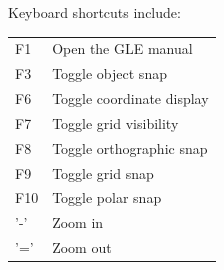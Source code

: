 \vspace{0.5cm}
Keyboard shortcuts include:

\begin{tabular}{l|l}
F1 & Open the GLE manual \\
F3 & Toggle object snap \\
F6 & Toggle coordinate display \\
F7  & Toggle grid visibility \\
F8  & Toggle orthographic snap \\
F9  & Toggle grid snap \\
F10 & Toggle polar snap \\
'-' & Zoom in \\
'=' & Zoom out \\
\end{tabular}
